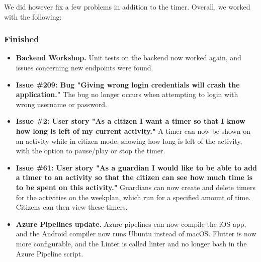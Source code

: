 We did however fix a few problems in addition to the timer. Overall, we worked with the following:

\subsubsection{Finished}
\begin{itemize}
    \item \textbf{Backend Workshop.}
        \subitem Unit tests on the backend now worked again, and issues concerning new endpoints were found.
    \item \textbf{Issue \#209: Bug "Giving wrong login credentials will crash the application."}
        \subitem The bug no longer occurs when attempting to login with wrong username or password.
    \item \textbf{Issue \#2: User story "As a citizen I want a timer so that I know how long is left of my current activity."}
        \subitem A timer can now be shown on an activity while in citizen mode, showing how long is left of the activity, with the option to pause/play or stop the timer.
    \item \textbf{Issue \#61: User story "As a guardian I would like to be able to add a timer to an activity so that the citizen can see how much time is to be spent on this activity."}
        \subitem Guardians can now create and delete timers for the activities on the weekplan, which run for a specified amount of time. Citizens can then view these timers.
    \item \textbf{Azure Pipelines update.}
        \subitem Azure pipelines can now compile the iOS app, and the Android compiler now runs Ubuntu instead of macOS. Flutter is now more configurable, and the Linter is called linter and no longer bash in the Azure Pipeline script.
\end{itemize}
